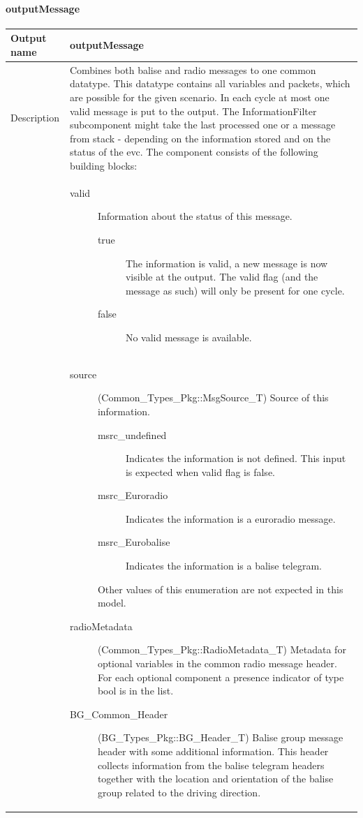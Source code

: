 \paragraph{outputMessage}

\begin{longtable}{p{}p{}}
\toprule
Output name				& outputMessage \\
\midrule
Description				& Combines both balise and radio messages to one common datatype. This datatype contains all variables and packets, which are possible for the given scenario. In each cycle at most one valid message is put to the output. The InformationFilter subcomponent might take the last processed one or a message from stack - depending on the information stored and on the status of the evc. The component consists of the following building blocks:\\
&
\begin{description}
\item[valid] Information about the status of this message.
\begin{description}
\item[true] The information is valid, a new message is now visible at the output. The valid flag (and the message as such) will only be present for one cycle.
\item[false] No valid message is available.
\end{description}
\end{description}\\
&
\begin{description}
\item[source](Common\_Types\_Pkg::MsgSource\_T) Source of this information. 
\begin{description}
\item[msrc\_undefined] Indicates the information is not defined. This input is expected when valid flag is false.
\item[msrc\_Euroradio] Indicates the information is a euroradio message.
\item[msrc\_Eurobalise] Indicates the information is a balise telegram.
\end{description}
Other values of this enumeration are not expected in this model.
\item[radioMetadata](Common\_Types\_Pkg::RadioMetadata\_T) Metadata for optional variables in the common radio message header. For each optional component a presence indicator of type bool is in the list.  
\item[BG\_Common\_Header](BG\_Types\_Pkg::BG\_Header\_T) Balise group message header with some additional information. This header collects information from the balise telegram headers together with the location and orientation of the balise group related to the driving direction.


\end{description}
\end{longtable}
